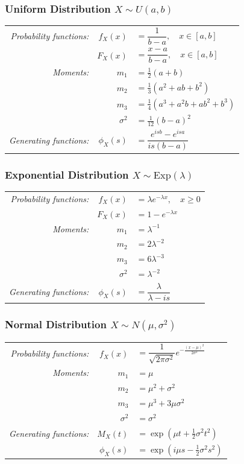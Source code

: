 \documentclass[11pt,a4paper]{article}
\theoremstyle{definition}
\begin{document}
\subsubsection*{Uniform Distribution $X \sim U(a,b)$}
{\renewcommand{\arraystretch}{1.6}
\begin{longtable}{r r l}
\textit{Probability functions:} & $f_X(x)$ & $=\dfrac{1}{b-a}, \quad x\in[a,b]$\\
& $F_X(x)$ & $=\dfrac{x-a}{b-a}, \quad x\in[a,b]$\\
\textit{Moments:} & $m_1$ & $=\frac{1}{2}(a+b)$\\
& $m_2$ & $=\frac{1}{3}(a^2+ab+b^2)$\\
& $m_3$ & $=\frac{1}{4}(a^3+a^2b+ab^2+b^3)$\\
& $\sigma^2$ & $=\frac{1}{12}(b-a)^2$\\
\textit{Generating functions:} 
& $\phi_X(s)$ & $=\dfrac{e^{isb}-e^{isa}}{is(b-a)}$\\
\end{longtable}
}

\subsubsection*{Exponential Distribution $X \sim \text{Exp}(\lambda)$}
\begin{longtable}{r r l}
\textit{Probability functions:} & $f_X(x)$ & $=\lambda e^{-\lambda x}, \quad x\ge0$\\
& $F_X(x)$ & $=1-e^{-\lambda x}$\\
\textit{Moments:} & $m_1$ & $=\lambda^{-1}$\\
& $m_2$ & $=2\lambda^{-2}$\\
& $m_3$ & $=6\lambda^{-3}$\\
& $\sigma^2$ & $=\lambda^{-2}$\\
\textit{Generating functions:} 
& $\phi_X(s)$ & $=\dfrac{\lambda}{\lambda-is}$\\
\end{longtable}


\subsubsection*{Normal Distribution $X \sim N(\mu,\sigma^2)$}
\begin{longtable}{r r l}
\textit{Probability functions:} & $f_X(x)$ & $=\dfrac{1}{\sqrt{2\pi\sigma^2}}e^{-\frac{(x-\mu)^2}{2\sigma^2}}$ \vspace{0.1cm}\\
\textit{Moments:} & $m_1$ & $=\mu$\\
& $m_2$ & $=\mu^2+\sigma^2$\\
& $m_3$ & $=\mu^3+3\mu\sigma^2$\\
& $\sigma^2$ & $=\sigma^2$\\
\textit{Generating functions:} & $M_X(t)$ & $=\exp(\mu t+\frac{1}{2}\sigma^2t^2)$\\
& $\phi_X(s)$ & $=\exp(i\mu s-\frac{1}{2}\sigma^2s^2)$\\
\end{longtable}
\end{document}
